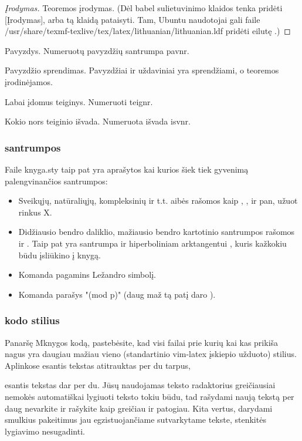 \begin{proof}[Įrodymas]
  Teoremos įrodymas. (Dėl babel sulietuvinimo klaidos tenka pridėti
  [Įrodymas], arba tą klaidą pataisyti. Tam, Ubuntu naudotojai gali faile
  /usr/share/texmf-texlive/tex/latex/lithuanian/lithuanian.ldf pridėti
  eilutę \def\proofname{\k{I}rodymas}.)
\end{proof}

\begin{pav}
  Pavyzdys. Numeruotų pavyzdžių santrumpa pavnr.
\end{pav}

\begin{sprendimas}
  Pavyzdžio sprendimas. Pavyzdžiai ir uždaviniai yra sprendžiami, o
  teoremos įrodinėjamos.
\end{sprendimas}

\begin{teig}
  Labai įdomus teiginys. Numeruoti teignr.
\end{teig}

\begin{isv}
  Kokio nors teiginio išvada. Numeruota išvada isvnr.
\end{isv}

\subsubsection{santrumpos}

Faile knyga.sty taip pat yra aprašytos kai kurios šiek tiek gyvenimą
palengvinančios santrumpos:

\begin{itemize}
  \item Sveikųjų, natūraliųjų, kompleksinių ir t.t. aibės rašomos kaip \Z,
    \N, \C ir pan, užuot rinkus {\mathbb X}.
  \item Didžiausio bendro daliklio, mažiausio bendro kartotinio santrumpos
    rašomos \dbd ir \mbk. Taip pat yra santrumpa ir hiperboliniam
    arktangentui \arctanh, kuris kažkokiu būdu įsliūkino į knygą.
  \item Komanda  pagamins Ležandro simbolį.
  \item Komanda  parašys "(mod p)" (daug maž tą patį daro ).
\end{itemize}

\subsubsection{kodo stilius}

Panaršę Mknygos kodą, pastebėsite, kad visi failai prie kurių kai kas
prikiša nagus yra daugiau mažiau vieno (standartinio vim-latex įskiepio
užduoto) stilius. Aplinkose esantis tekstas atitrauktas per du tarpus, \item
esantis tekstas dar per du. Jūsų naudojamas teksto radaktorius greičiausiai
nemokės automatiškai lygiuoti teksto tokiu būdu, tad rašydami naują tekstą
per daug nevarkite ir rašykite kaip greičiau ir patogiau. Kita vertus,
darydami smulkius pakeitimus jau egzistuojančiame sutvarkytame tekste,
stenkitės lygiavimo nesugadinti.

